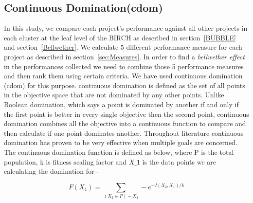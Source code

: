 \documentclass[sigconf,review]{acmart}
\theoremstyle{break}
\begin{document}
\subsection{Continuous Domination(cdom)}
\label{cdom}
In this study, we compare each project's performance against all other projects in each cluster at the leaf level of the BIRCH as described in section~\ref{BUBBLE} and section~\ref{Bellwether}. We calculate 5 different performance measure for each project as described in section~\ref{sec:Measures}. In order to find a \textit{bellwether effect} in the performances collected we need to combine those 5 performance measures and then rank them using certain criteria. We have used continuous domination (cdom) for this purpose. continuous domination is defined as the set of all points in the objective space that are not dominated by any other points. Unlike Boolean domination, which says a point is dominated by another if and only if the first point is better in every single objective then the second point, continuous domination combines all the objective into a continuous function to compare and then calculate if one point dominates another. Throughout literature continuous domination has proven to be very effective when multiple goals are concerned. The continuous domination function is defined as below, where P is the total population, k is fitness scaling factor and $X\_1$ is the data points we are calculating the domination for - 

\begin{equation}
    F(X_1) = \sum_{{(X_2\in P) - X_1}} -e^{-I(X_2,X_1)/k}
\end{equation}
\end{document}
